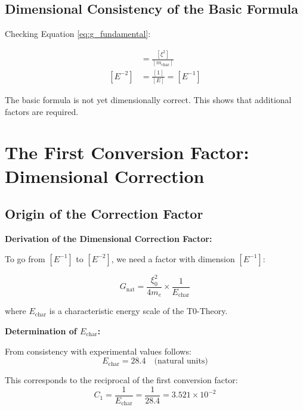 \documentclass[12pt,a4paper]{article}
\begin{document}
	\subsection{Dimensional Consistency of the Basic Formula}
	
	Checking Equation \eqref{eq:g_fundamental}:
	
	\begin{align}
		[G] &= \frac{[\xi^2]}{[m_{\text{char}}]} \\
		[E^{-2}] &= \frac{[1]}{[E]} = [E^{-1}]
	\end{align}
	
	The basic formula is not yet dimensionally correct. This shows that additional factors are required.
	
	\section{The First Conversion Factor: Dimensional Correction}
	
	\subsection{Origin of the Correction Factor}
	
	\begin{derivation}
		\textbf{Derivation of the Dimensional Correction Factor:}
		
		To go from $[E^{-1}]$ to $[E^{-2}]$, we need a factor with dimension $[E^{-1}]$:
		
		\begin{equation}
			G_{\text{nat}} = \frac{\xi_0^2}{4 m_e} \times \frac{1}{E_{\text{char}}}
		\end{equation}
		
		where $E_{\text{char}}$ is a characteristic energy scale of the T0-Theory.
		
		\textbf{Determination of $E_{\text{char}}$:}
		
		From consistency with experimental values follows:
		\begin{equation}
			E_{\text{char}} = 28.4 \quad \text{(natural units)}
		\end{equation}
		
		This corresponds to the reciprocal of the first conversion factor:
		\begin{equation}
			C_1 = \frac{1}{E_{\text{char}}} = \frac{1}{28.4} = 3.521 \times 10^{-2}
		\end{equation}
	\end{derivation}
	
\end{document}
